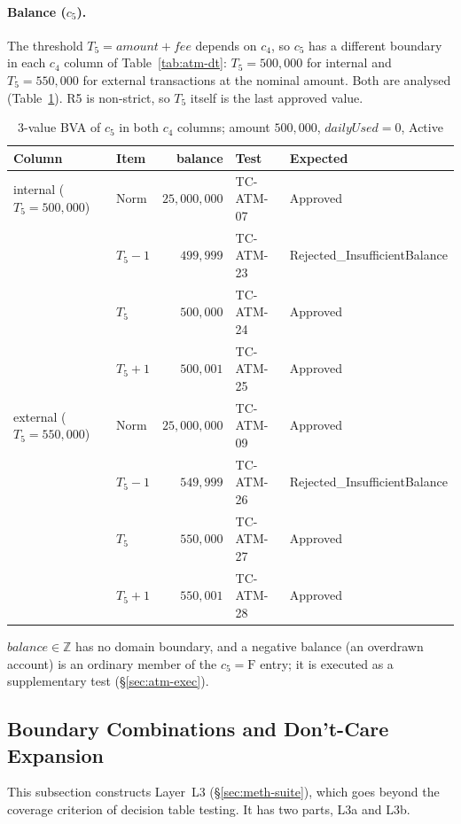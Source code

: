 \documentclass[11pt,a4paper]{article}
\newcommand{\Norm}{\mathrm{Norm}}
\begin{document}
\paragraph{Balance (\(c_5\)).} The threshold \(T_5=\mathit{amount}+\mathit{fee}\)
depends on \(c_4\), so \(c_5\) has a different boundary in each \(c_4\)
column of Table~\ref{tab:atm-dt}: \(T_5=500{,}000\) for internal and
\(T_5=550{,}000\) for external transactions at the nominal amount. Both are
analysed (Table~\ref{tab:atm-balance-bva}). R5 is non-strict, so \(T_5\)
itself is the last approved value.

\begin{table}[H]
\centering
\caption{3-value BVA of \(c_5\) in both \(c_4\) columns; amount \(500{,}000\), \(\mathit{dailyUsed}=0\), Active}
\label{tab:atm-balance-bva}
\small
\begin{tabular}{l l r l l}
\toprule
Column & Item & balance & Test & Expected \\
\midrule
internal (\(T_5=500{,}000\)) & \(\Norm\) & \(25{,}000{,}000\) & TC-ATM-07 & Approved \\
 & \(T_5-1\) & \(499{,}999\) & TC-ATM-23 & Rejected\_InsufficientBalance \\
 & \(T_5\) & \(500{,}000\) & TC-ATM-24 & Approved \\
 & \(T_5+1\) & \(500{,}001\) & TC-ATM-25 & Approved \\
external (\(T_5=550{,}000\)) & \(\Norm\) & \(25{,}000{,}000\) & TC-ATM-09 & Approved \\
 & \(T_5-1\) & \(549{,}999\) & TC-ATM-26 & Rejected\_InsufficientBalance \\
 & \(T_5\) & \(550{,}000\) & TC-ATM-27 & Approved \\
 & \(T_5+1\) & \(550{,}001\) & TC-ATM-28 & Approved \\
\bottomrule
\end{tabular}
\end{table}

\(\mathit{balance}\in\mathbb{Z}\) has no domain boundary, and a negative
balance (an overdrawn account) is an ordinary member of the \(c_5=\mathrm{F}\)
entry; it is executed as a supplementary test (\S\ref{sec:atm-exec}).
\subsection{Boundary Combinations and Don't-Care Expansion}
\label{sec:atm-combos}

This subsection constructs Layer~L3 (\S\ref{sec:meth-suite}), which goes
beyond the coverage criterion of decision table testing. It has two parts,
L3a and L3b.
\end{document}
